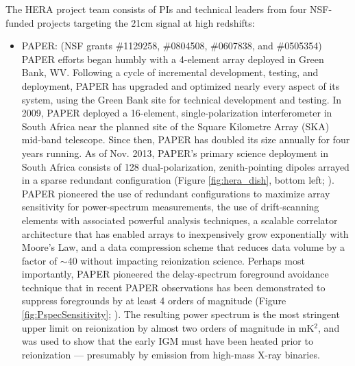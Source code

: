 \documentclass[preprint]{aastex}
\begin{document}
The HERA project team consists of PIs and technical leaders from four NSF-funded projects targeting the 21cm signal
at high redshifts:
\begin{itemize}[noitemsep,nolistsep]
\item{PAPER:} (NSF grants \#1129258, \#0804508, \#0607838, and \#0505354) PAPER efforts began humbly with a 4-element
array deployed in Green Bank, WV.  Following a cycle of incremental
development, testing, and deployment, PAPER has upgraded and optimized nearly every aspect of its system, using the Green Bank site
for technical development and testing.  In 2009, PAPER deployed a 16-element, single-polarization interferometer in South Africa
near the planned site of the Square Kilometre Array (SKA) mid-band telescope.  
Since then, PAPER has doubled its size annually for four years running.  As of Nov. 2013, PAPER's primary science
deployment in South Africa consists of 128 dual-polarization, zenith-pointing dipoles arrayed in a sparse redundant configuration
(Figure \ref{fig:hera_dish}, bottom left; \citealt{parsons_et_al2012a}).  PAPER pioneered the use of redundant configurations
to maximize array sensitivity for power-spectrum measurements, the use of drift-scanning elements with associated powerful
analysis techniques, a scalable correlator architecture that has enabled arrays to inexpensively grow exponentially
with Moore's Law, and a data compression scheme that reduces data volume by a factor of $\sim$40 without impacting
reionization science.  Perhaps most importantly, PAPER pioneered the delay-spectrum foreground avoidance technique \cite{parsons_et_al2012b}
that in recent PAPER observations has been demonstrated to suppress foregrounds by at least 4 orders of magnitude 
(Figure \ref{fig:PspecSensitivity}; \citealt{parsons_et_al2013}).  The resulting power spectrum is the most stringent upper
limit on reionization by almost two orders of magnitude in mK$^2$, and was used to show that the early IGM must have
been heated prior to reionization --- presumably by emission from high-mass X-ray binaries.


\end{itemize}
\end{document}
